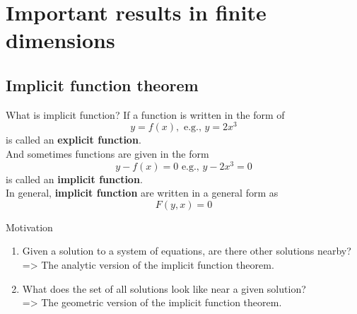 \section{Important results in finite dimensions}

\subsection{Implicit function theorem}

\begin{frame}{What is implicit function?}
    If a function is written in the form of
    \begin{equation}
        y = f(x), \text{ e.g., } y = 2x^3
    \end{equation}
    is called an \textbf{explicit function}. 
    \\And sometimes functions are given in the form 
    \begin{equation}
        y - f(x) = 0 \text{ e.g., } y - 2x^3 = 0
    \end{equation}
    is called an \textbf{implicit function}.\\
    In general, \textbf{implicit function} are written in a general form as
    \begin{equation}
        F(y, x) = 0
    \end{equation}
\end{frame}

\begin{frame}{Motivation}
    \begin{parchment}[Question]
        \begin{enumerate}
            \item Given a solution to a system of equations, are there other solutions nearby? \\=> The analytic version of the implicit function theorem.
            \item What does the set of all solutions look like near a given solution? \\=> The geometric version of the implicit function theorem.
        \end{enumerate}
    \end{parchment}
\end{frame}

